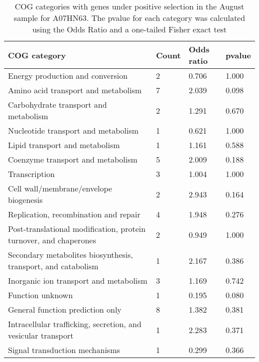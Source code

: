 \begin{table}[hb]
\footnotesize 
	\tabcolsep=0.11cm 
\caption{COG categories with genes under positive selection in the August sample for A07HN63. The pvalue for each category was calculated using the Odds Ratio and a one-tailed Fisher exact test \\} 
\begin{tabularx}{\textwidth}{L{6cm}R{2cm}R{2cm}R{2cm}} 
\hline 
\textbf{COG category} & \textbf{Count} & \textbf{Odds ratio} & \textbf{pvalue} \\ 
\hline 
Energy production and conversion & 2 & 0.706 & 1.000 \\ 
Amino acid transport and metabolism & 7 & 2.039 & 0.098 \\ 
Carbohydrate transport and metabolism & 2 & 1.291 & 0.670 \\ 
Nucleotide transport and metabolism & 1 & 0.621 & 1.000 \\ 
Lipid transport and metabolism & 1 & 1.161 & 0.588 \\ 
Coenzyme transport and metabolism & 5 & 2.009 & 0.188 \\ 
Transcription & 3 & 1.004 & 1.000 \\ 
Cell wall/membrane/envelope biogenesis & 2 & 2.943 & 0.164 \\ 
Replication, recombination and repair & 4 & 1.948 & 0.276 \\ 
Post-translational modification, protein turnover, and chaperones & 2 & 0.949 & 1.000 \\ 
Secondary metabolites biosynthesis, transport, and catabolism & 1 & 2.167 & 0.386 \\ 
Inorganic ion transport and metabolism & 3 & 1.169 & 0.742 \\ 
Function unknown & 1 & 0.195 & 0.080 \\ 
General function prediction only & 8 & 1.382 & 0.381 \\ 
Intracellular trafficking, secretion, and vesicular transport & 1 & 2.283 & 0.371 \\ 
Signal transduction mechanisms & 1 & 0.299 & 0.366 \\ 
\end{tabularx} 
\label{August_COG_Selection_A07HN63} 
 \end{table} 

